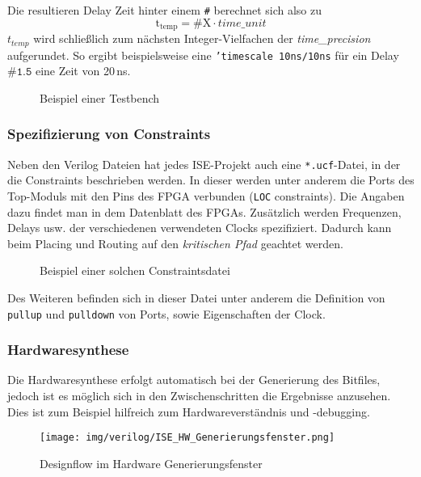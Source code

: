 Die resultieren Delay Zeit hinter einem \texttt{\#} berechnet sich also zu 
\begin{equation*}
\mathrm{t_{temp}} = \#\mathrm{X} \cdot {time\_unit}
\end{equation*}
$ t_{temp} $ wird schließlich zum nächsten Integer-Vielfachen der \emph{time\_precision} aufgerundet. So ergibt beispielsweise eine \texttt{'timescale 10ns/10ns} für ein Delay $ \texttt{\#1.5} $ eine Zeit von 20\,ns.

\begin{figure}[H]
	\lstset{style=verilog-style}
	
	\caption{Beispiel einer Testbench}
	\label{testbench}
\end{figure} 

\subsubsection{Spezifizierung von Constraints}
Neben den Verilog Dateien hat jedes ISE-Projekt auch eine \texttt{*.ucf}-Datei, in der die Constraints beschrieben werden. In dieser werden unter anderem die Ports des Top-Moduls mit den Pins des FPGA verbunden (\texttt{LOC} constraints). Die Angaben dazu findet man in dem Datenblatt des FPGAs. Zusätzlich werden Frequenzen, Delays usw. der verschiedenen verwendeten Clocks spezifiziert. Dadurch kann beim Placing und Routing auf den \emph{kritischen Pfad} geachtet werden.

\begin{figure}[H]
	\lstset{style=verilog-style}
	
	\caption{Beispiel einer solchen Constraintsdatei}
	\label{constraint}
\end{figure}

Des Weiteren befinden sich in dieser Datei unter anderem die Definition von \texttt{pullup} und \texttt{pulldown} von Ports, sowie Eigenschaften der Clock.


\subsubsection{Hardwaresynthese}
Die Hardwaresynthese erfolgt automatisch bei der Generierung des Bitfiles, jedoch ist es möglich sich in den Zwischenschritten die Ergebnisse anzusehen. Dies ist zum Beispiel hilfreich zum Hardwareverständnis und -debugging.

\begin{figure}[H]
	\centering
	\texttt{[image: img/verilog/ISE\_HW\_Generierungsfenster.png]}
	\caption{Designflow im Hardware Generierungsfenster}
	\label{fig:gen_window}
\end{figure}

